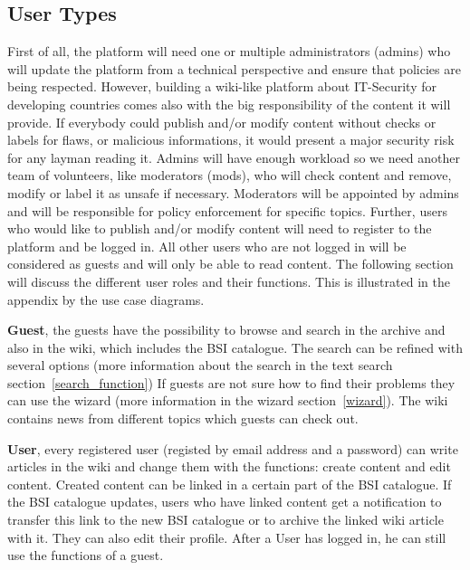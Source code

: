 \subsection{User Types} 
\label{user_types}

First of all, the platform will need one or multiple administrators (admins) who will update the platform from a technical perspective and ensure that policies are being respected. 
However, building a wiki-like platform about IT-Security for developing countries comes also with the big responsibility of the content it will provide. 
If everybody could publish and/or modify content without checks or labels for flaws, or malicious informations, it would present a major security risk for any layman reading it. 
Admins will have enough workload so we need another team of volunteers, like moderators (mods), who will check content and remove, modify or label it as unsafe if necessary. 
Moderators will be appointed by admins and will be responsible for policy enforcement for specific topics. 
Further, users who would like to publish and/or modify content will need to register to the platform and be logged in. 
All other users who are not logged in will be considered as guests and will only be able to read content. 
The following section will discuss the different user roles and their functions. 
This is illustrated in the appendix by the use case diagrams. 
\bigskip

\textbf{Guest}, the guests have the possibility to browse and search in the archive and also in the wiki, which includes the BSI catalogue. The search can be refined with several options (more information about the search in the text search section~\ref{search_function}) 
If guests are not sure how to find their problems they can use the wizard (more information in the wizard section~\ref{wizard}). 
The wiki contains news from different topics which guests can check out.
\bigskip

\textbf{User}, every registered user (registed by email address and a password) can write articles in the wiki and change them with the functions: create content and edit content. 
Created content can be linked in a certain part of the BSI catalogue. 
If the BSI catalogue updates, users who have linked content get a notification to transfer this link to the new BSI catalogue or to archive the linked wiki article with it.
They can also edit their profile. 
After a User has logged in, he can still use the functions of a guest.
\bigskip

